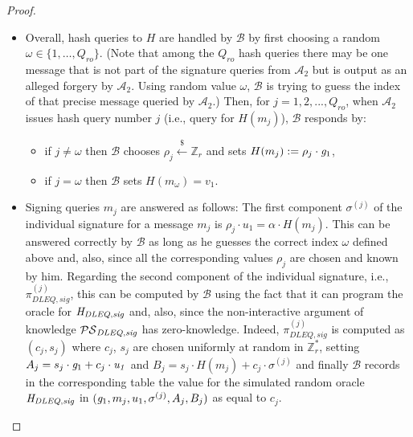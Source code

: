 \begin{proof}
\begin{itemize}
\item Overall, hash queries to $H$ are handled %
by $\mathcal{B}$ by first choosing a random $\omega \in \{1, \ldots, Q_{\mathit{ro}}\}$. 
(Note that among the $Q_{\mathit{ro}}$ hash queries there may be one message that is not part of the signature queries from 
$\mathcal{A}_2$ but is output as an alleged forgery by $\mathcal{A}_2$. Using random value $\omega$, $\mathcal{B}$ is trying to 
guess the index of that precise message queried by $\mathcal{A}_2$.)
Then, for $j = 1,2,..., Q_{\mathit{ro}}$, when $\mathcal{A}_2$ issues hash query number $j$ (i.e., query for $H(m_j)$), 
$\mathcal{B}$ responds by:
\begin{itemize}
\item if $j \neq \omega$ then $\mathcal{B}$ chooses $\rho_j \xleftarrow{\$} \mathbb{Z}_r$ and sets $H(m_j) :=  \rho_j \cdot \mathit{g}_{1}$,
\item if $j = \omega$ then $\mathcal{B}$ sets $H(m_{\omega}) = v_1$.
\end{itemize}
\item Signing queries $m_j$ are answered as follows: The first component $\sigma^{(j)}$ of the individual 
signature for a message $m_j$ is $\rho_j \cdot u_1 = \alpha \cdot H(m_j)$. This can be answered correctly by $\mathcal{B}$ 
as long as he guesses the correct index $\omega$ defined above and, also, since all the corresponding values $\rho_j$ 
are chosen and known by him. Regarding the second component of the individual signature, i.e., 
$\pi^{(j)}_{\mathit{DLEQ}, \mathit{sig}}$, this can be computed by $\mathcal{B}$ using the fact 
that it can program the oracle for $\mathit{H}_{\mathit{DLEQ}, \mathit{sig}}$ and, also, since the non-interactive argument of knowledge $\mathcal{PS}_{\mathit{DLEQ}, \mathit{sig}}$ has zero-knowledge. Indeed, 
$\pi^{(j)}_{\mathit{DLEQ}, \mathit{sig}}$ is computed as $(c_j, s_j)$ where $c_j$, $s_j$ are chosen 
uniformly at random in $\mathbb{Z}_r^*$, setting $A_j = s_j \cdot \mathit{g}_{1} + c_j \cdot \mathit{u_1}$ and 
$B_j = s_j \cdot H(m_j)  + c_j \cdot \sigma^{(j)}$ and finally $\mathcal{B}$ records in the corresponding table 
the value for the simulated random oracle $\mathit{H}_{\mathit{DLEQ}, \mathit{sig}}$ in $(\mathit{g}_{1}, m_j, u_1, \sigma^{(j)}, A_j, B_j)$ as equal to $c_j$. 
 

\end{itemize}
\end{proof}
